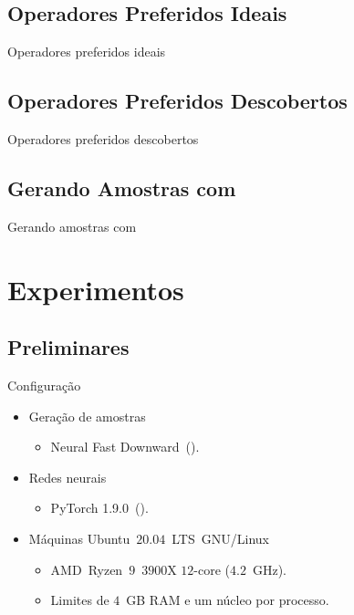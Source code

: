 \documentclass{beamer}
\begin{document}
\subsection{Operadores Preferidos Ideais}
\begin{frame}{Operadores preferidos ideais}
\end{frame}

\subsection{Operadores Preferidos Descobertos}
\begin{frame}{Operadores preferidos descobertos}
\end{frame}

\subsection{Gerando Amostras com \bfsrs}
\begin{frame}{Gerando amostras com \bfsrs}
\end{frame}

\section{Experimentos}
\subsection{Preliminares}
\begin{frame}{Configuração}
\begin{itemize}
  \item Geração de amostras
  \begin{itemize}
    \item Neural Fast Downward~(\cite{Ferber.etal/2020a}).
  \end{itemize}
  \item Redes neurais
  \begin{itemize}
    \item PyTorch 1.9.0~(\cite{Paszke/2019}).
  \end{itemize}
  \item Máquinas Ubuntu~$20.04$~LTS~GNU/Linux
  \begin{itemize}
    \item AMD~Ryzen~$9$~$3900$X $12$-core ($4.2$~GHz).
    \item Limites de $4$~GB RAM e um núcleo por processo.
  \end{itemize}
\end{itemize}
\end{frame}
\end{document}
